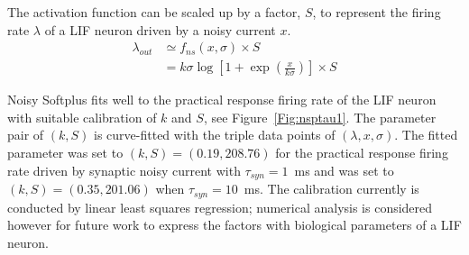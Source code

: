 	The activation function can be scaled up by a factor, $S$, to represent the firing rate $\lambda$ of a LIF neuron driven by a noisy current $x$.
	\begin{equation}
	\begin{aligned}
	\lambda_{out} &\simeq f_{ns}(x, \sigma) \times S\\
	&=k \sigma \log [1 + \exp(\frac{x}{k \sigma})] \times S
	\end{aligned}
	\label{equ:fit}
	\end{equation}	
	
	Noisy Softplus fits well to the practical response firing rate of the LIF neuron with suitable calibration of $k$ and $S$, see Figure~\ref{Fig:nsptau1}.
	The parameter pair of $(k, S)$ is curve-fitted with the triple data points of $(\lambda, x, \sigma)$.
	The fitted parameter was set to $(k, S)=(0.19,208.76)$ for the practical response firing rate driven by synaptic noisy current with $\tau_{syn}=1$~ms and was set to $(k, S)=(0.35,201.06)$ when $\tau_{syn}=10$~ms.
	The calibration currently is conducted by linear least squares regression; numerical analysis is considered however for future work to express the factors with biological parameters of a LIF neuron.
	
